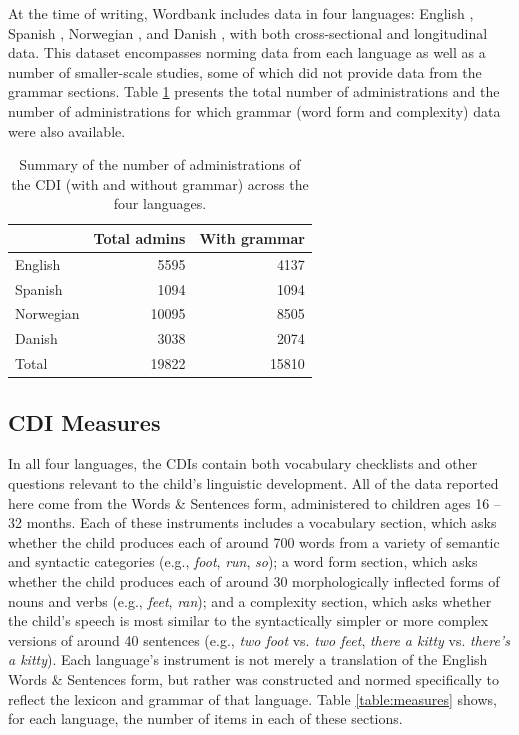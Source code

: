 \documentclass[10pt,letterpaper]{article}
\begin{document}
At the time of writing, Wordbank includes data in four languages: English \cite{fenson2007}, Spanish \cite{jackson1993}, Norwegian \cite{simonsen2014}, and Danish \cite{bleses2008}, with both cross-sectional and longitudinal data. This dataset encompasses norming data from each language as well as a number of smaller-scale studies, some of which did not provide data from the grammar sections. Table \ref{table:num} presents the total number of administrations and the number of administrations for which grammar (word form and complexity) data were also available.

\begin{table}[t]
\begin{center}
\begin{tabular}{lrr}
\hline
& Total admins & With grammar\\ 
\hline
English & 5595 & 4137\\ 
Spanish & 1094 & 1094\\ 
Norwegian & 10095 & 8505\\ 
Danish & 3038 & 2074\\ 
\hline
Total & 19822 & 15810 \\
\hline
\end{tabular}
\end{center}
\caption{\label{table:num} Summary of the number of administrations of the CDI (with and without grammar) across the four languages.}
\end{table}

\subsection{CDI Measures}

In all four languages, the CDIs contain both vocabulary checklists and other questions relevant to the child's linguistic development. All of the data reported here come from the Words \& Sentences form, administered to children ages 16 -- 32 months. Each of these instruments includes a vocabulary section, which asks whether the child produces each of around 700 words from a variety of semantic and syntactic categories (e.g., \emph{foot}, \emph{run}, \emph{so}); a word form section, which asks whether the child produces each of around 30 morphologically inflected forms of nouns and verbs (e.g., \emph{feet}, \emph{ran}); and a complexity section, which asks whether the child's speech is most similar to the syntactically simpler or more complex versions of around 40 sentences (e.g., \emph{two foot} vs. \emph{two feet}, \emph{there a kitty} vs. \emph{there's a kitty}). Each language's instrument is not merely a translation of the English Words \& Sentences form, but rather was constructed and normed specifically to reflect the lexicon and grammar of that language. Table \ref{table:measures} shows, for each language, the number of items in each of these sections.
\end{document}
